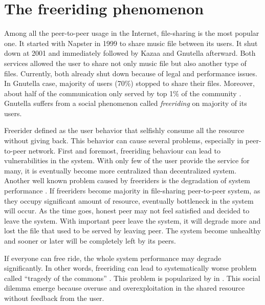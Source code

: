 \section{The freeriding phenomenon}
Among all the peer-to-peer usage in the Internet, file-sharing is the most popular one. It started with Napster in 1999 to share music file between its users. It shut down at 2001 and immediately followed by Kazaa and Gnutella afterward. Both services allowed the user to share not only music file but also another type of files. Currently, both already shut down because of legal and performance issues. In Gnutella case, majority of users (70\%) stopped to share their files. Moreover, about half of the communication only served by top 1\% of the community \cite{2000:freeridegnutella:adar}. Gnutella suffers from a social phenomenon called \textit{freeriding} on majority of its users.

Freerider defined as the user behavior that selfishly consume all the resource without giving back. This behavior can cause several problems, especially in peer-to-peer network. First and foremost, freeriding behaviour can lead to vulnerabilities in the system. With only few of the user provide the service for many, it is eventually become more centralized than decentralized system. Another well known problem caused by freeriders is the degradation of system performance \cite{2000:freeridegnutella:adar}. If freeriders become majority in file-sharing peer-to-peer system, as they occupy significant amount of resource, eventually bottleneck in the system will occur. As the time goes, honest peer may not feel satisfied and decided to leave the system. With important peer leave the system, it will degrade more and lost the file that used to be served by leaving peer. The system become unhealthy and sooner or later will be completely left by its peers.

If everyone can free ride, the whole system performance may degrade significantly. In other words, freeriding can lead to systematically worse problem called ``tragedy of the commons'' \cite{1968:tragedycommon:hardin}. This problem is popularized by \citet*{1968:tragedycommon:hardin} in \citeyear{1968:tragedycommon:hardin}. This social dilemma emerge because overuse and overexploitation in the shared resource without feedback from the user. 

